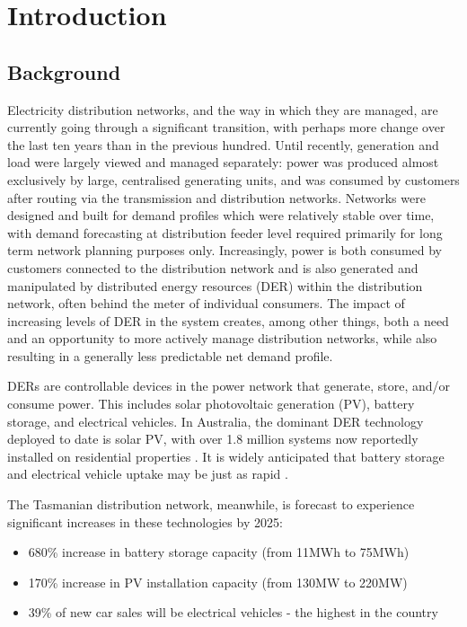 \chapter{Introduction}
\section{Background}
\label{background}
Electricity distribution networks, and the way in which they are managed, are currently going through a significant transition, with perhaps more change over the last ten years than in the previous hundred. %
Until recently, generation and load were largely viewed and managed separately: power was produced almost exclusively by large, centralised generating units, and was consumed by customers after routing via %
the transmission and distribution networks. 
Networks were designed and built for demand profiles which were relatively stable over time, with demand forecasting at distribution feeder level required primarily for long term network planning purposes only. 
Increasingly, power is both consumed by customers connected to the distribution network and is also generated and manipulated by distributed energy resources (DER) within the distribution network, often behind the meter of individual consumers. 
The impact of increasing levels of DER in the system creates, among other things, both a need and an opportunity to more actively manage distribution networks, while also resulting in a generally less predictable net demand profile.

DERs are controllable devices in the power network that generate, store, and/or consume power. 
This includes solar photovoltaic generation (PV), battery storage, and electrical vehicles. 
In Australia, the dominant DER technology deployed to date is solar PV, with over 1.8 million systems now reportedly installed on residential properties \cite{apvi2017}. 
It is widely anticipated that battery storage and electrical vehicle uptake may be just as rapid \cite{bloomberg2018}.

The Tasmanian distribution network, meanwhile, is forecast to experience significant increases in these technologies by 2025: \\
\begin{itemize}
	\item 680\% increase in battery storage capacity (from 11MWh to 75MWh) \cite{Jacobs2017}
	\item 170\% increase in PV installation capacity (from 130MW to 220MW) \cite{Jacobs2017}
	\item 39\% of new car sales will be electrical vehicles - the highest in the country \cite{AEMO2016}
\end{itemize}


